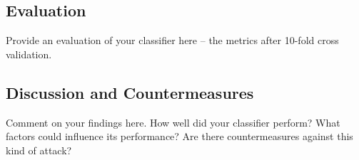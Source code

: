 \documentclass[10pt,conference,compsocconf]{IEEEtran}
\begin{document}
\subsection{Evaluation}
Provide an evaluation of your classifier here -- the metrics after 10-fold cross validation.

\subsection{Discussion and Countermeasures}
Comment on your findings here. How well did your classifier perform? What factors could influence its performance? Are there countermeasures against this kind of attack?



\end{document}
